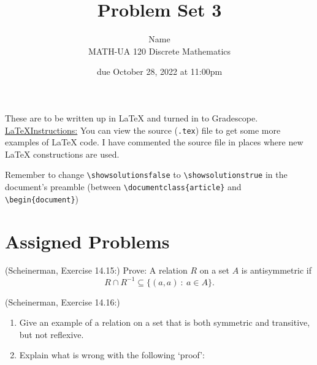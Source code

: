 \documentclass{article}
\title{Problem Set 3}
\author{%
    Name
\\  MATH-UA 120 Discrete Mathematics
}
\date{due October 28, 2022 at 11:00pm}
\newif\ifshowsolutions
\newcommand{\danger}{\marginpar[\hfill\dbend]{\dbend\hfill}}
\theoremstyle{definition}
\begin{document}
\maketitle



These are to be written up in \LaTeX{} and turned in to Gradescope.\\



\ifshowsolutions
    \SetupExSheets{solution/print=true}
\else
    \danger
 \underline{ \LaTeX  Instructions:}  You can view the source (\texttt{.tex}) file to get some more examples of \LaTeX{} code.  I have commented the source file in places where new \LaTeX{} constructions are used.
  
  Remember to change \verb|\showsolutionsfalse| to \verb|\showsolutionstrue|
    in the document's preamble 
    (between \verb|\documentclass{article}| and \verb|\begin{document}|)
\fi

\section*{Assigned Problems}

\begin{question}
    (Scheinerman, Exercise 14.15:)
    Prove: A relation $R$ on a set $A$ is antisymmetric if 
    \[ R \cap R^{-1} \subseteq \{ (a, a) ~:~ a \in A \}. \]
\end{question}
\begin{solution}
\end{solution}


\begin{question}
    (Scheinerman, Exercise 14.16:)
    \begin{enumerate}
        \item Give an example of a relation on a set that is both symmetric and transitive, but not reflexive.
        \item Explain what is wrong with the following `proof':
        
    \end{enumerate}
\end{question}
\begin{solution}
\end{solution}
\end{document}
